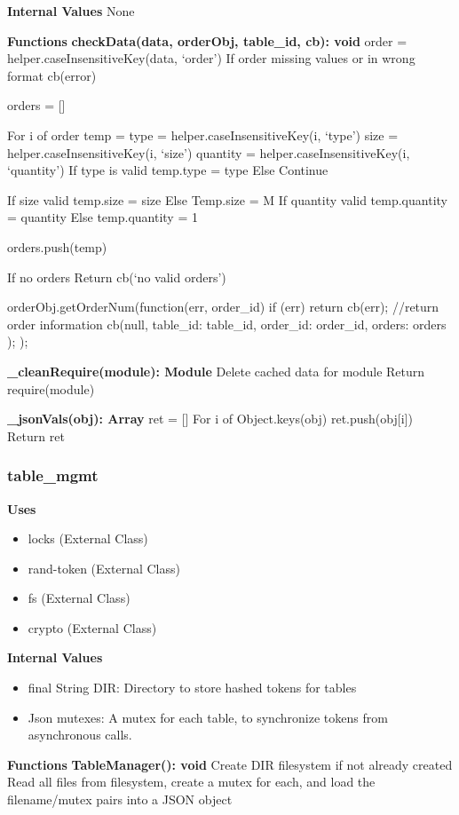 \documentclass [10pt]{article}
\begin{document}
\textbf{Internal Values}
None

\textbf{Functions}
\textbf{checkData(data, orderObj, table\_id, cb): void}
order = helper.caseInsensitiveKey(data, ‘order’)
If order missing values or in wrong format
	cb(error)

orders = []

For i of order
	temp = {}
	type = helper.caseInsensitiveKey(i, ‘type’)
	size = helper.caseInsensitiveKey(i, ‘size’)
	quantity =  helper.caseInsensitiveKey(i, ‘quantity’)
	If type is valid
		temp.type = type
	Else
		Continue
	
	If size valid
		temp.size = size
	Else 
		Temp.size = M
	If quantity valid
		temp.quantity  = quantity 
	Else 
		temp.quantity  = 1
	
	orders.push(temp)

If no orders
	Return cb(‘no valid orders’)

orderObj.getOrderNum(function(err, order\_id) {
	if (err) {
		return cb(err);
	}
	//return order information
	cb(null, {
		table\_id: table\_id,
		order\_id: order\_id,
		orders: orders
	});
});

\textbf{\_cleanRequire(module): Module}
Delete cached data for module
Return require(module)

\textbf{\_jsonVals(obj): Array}
ret = []
For i of Object.keys(obj)
	ret.push(obj[i])
Return ret

\subsubsection{table\_mgmt}
\textbf{Uses}
\begin{itemize}
	\item locks (External Class)
	\item rand-token (External Class)
	\item fs (External Class)
	\item crypto (External Class)
\end{itemize}

\textbf{Internal Values}
\begin{itemize}
	\item final String DIR: Directory to store hashed tokens for tables
	\item Json mutexes: A mutex for each table, to synchronize tokens from asynchronous calls.
\end{itemize}

\textbf{Functions}
\textbf{TableManager(): void}
Create DIR filesystem if not already created
Read all files from filesystem, create a mutex for each, and load the filename/mutex pairs into a JSON object
\end{document}
